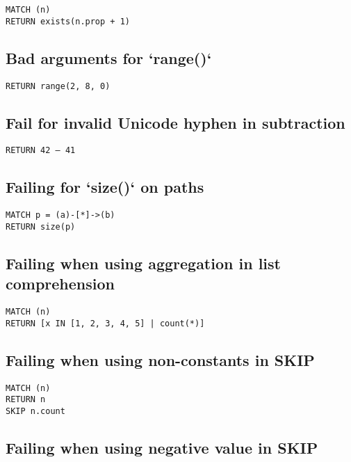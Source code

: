 \begin{lstlisting}
MATCH (n)
RETURN exists(n.prop + 1)
\end{lstlisting}

\subsection{Bad arguments for `range()`}

\begin{lstlisting}
RETURN range(2, 8, 0)
\end{lstlisting}

\subsection{Fail for invalid Unicode hyphen in subtraction}

\begin{lstlisting}
RETURN 42 — 41
\end{lstlisting}

\subsection{Failing for `size()` on paths}

\begin{lstlisting}
MATCH p = (a)-[*]->(b)
RETURN size(p)
\end{lstlisting}

\subsection{Failing when using aggregation in list comprehension}

\begin{lstlisting}
MATCH (n)
RETURN [x IN [1, 2, 3, 4, 5] | count(*)]
\end{lstlisting}

\subsection{Failing when using non-constants in SKIP}

\begin{lstlisting}
MATCH (n)
RETURN n
SKIP n.count
\end{lstlisting}

\subsection{Failing when using negative value in SKIP}

